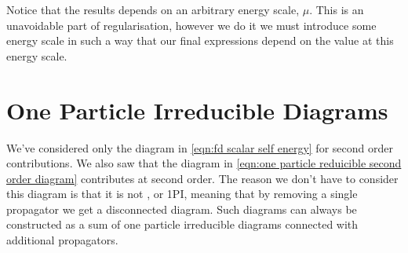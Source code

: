 \documentclass[fleqn]{NotesClass}
\begin{document}
    Notice that the results depends on an arbitrary energy scale, \(\mu\).
    This is an unavoidable part of regularisation, however we do it we must introduce some energy scale in such a way that our final expressions depend on the value at this energy scale.
    
    \section{One Particle Irreducible Diagrams}
    We've considered only the diagram in \cref{eqn:fd scalar self energy} for second order contributions.
    We also saw that the diagram in \cref{eqn:one particle reduicible second order diagram} contributes at second order.
    The reason we don't have to consider this diagram is that it is not , or 1PI, meaning that by removing a single propagator we get a disconnected diagram.
    Such diagrams can always be constructed as a sum of one particle irreducible diagrams connected with additional propagators.
    
\end{document}
